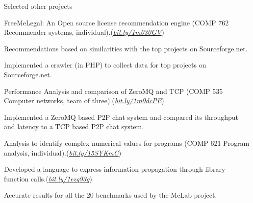 \documentclass{resume} %
\begin{document}
\begin{rSection}{Selected other projects}\smallskip \begin{lSubsection}
  
\item FreeMeLegal: An Open source license recommendation
engine (COMP 762 Recommender systems,
individual).(\href{http://bit.ly/1m030GV}{\em{bit.ly/1m030GV}}) 
\begin{lsubSubsection}
\item Recommendations based on similarities with the top projects on
Sourceforge.net.
\item Implemented a crawler (in {PHP}) to collect data for top projects 
on Sourceforge.net.
\end{lsubSubsection}
\item Performance
Analysis and comparison of ZeroMQ and TCP (COMP 535 Computer networks, team of
three).(\href{http://bit.ly/1m0dcPE}{\em{bit.ly/1m0dcPE}})  
\begin{lsubSubsection}
\item Implemented a ZeroMQ based P2P chat system and compared its throughput
  and latency to a TCP based P2P chat system.
\end{lsubSubsection}

\item Analysis to identify complex numerical values for \matlab programs (COMP
621 Program analysis,
individual).(\href{https://github.com/Sable/mclab/tree/master/languages/Natlab/src/natlab/tame/valueanalysis/components/isComplex}{\em{bit.ly/15SYKmC}}) 
\begin{lsubSubsection}
\item Developed a language to express information propagation through library
function calls.(\href{http://bit.ly/1ezq93q}{\em{bit.ly/1ezq93q}})
\item Accurate results for all the 20 benchmarks used by the 
McLab project.   
\end{lsubSubsection}


\end{lSubsection}
\end{rSection}
\end{document}
